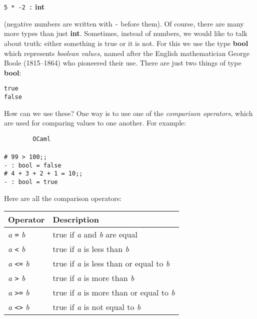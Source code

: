 \documentclass[]{book}
\newcommand{\smspace}{\vspace{4mm}}
\begin{document}
\smspace
\texttt{5 * -2 :}\textbf{\textsf{ int}}
\smspace

\noindent (negative numbers are written with \texttt{-} before them). Of course, there are many more types than just \textsf{\textbf{int}}. Sometimes, instead of numbers, we would like to talk about truth: either something is true or it is not. For this we use the type \textsf{\textbf{bool}} which represents \textit{boolean values}, named after the English mathematician George Boole (1815--1864) who pioneered their use. There are just two things of type \textbf{\textsf{bool}}:

\smspace
{}\texttt{true}\\
\indent{}\texttt{false}
\smspace

\noindent How can we use these? One way is to use one of the \textit{comparison operators}, which are used for comparing values to one another. For example:

\smspace
\noindent\verb!        OCaml!\\
\noindent\\
\noindent\verb!# 99 > 100;;!\\
\noindent\verb!- : bool = false!\\
\noindent\verb!# 4 + 3 + 2 + 1 = 10;;!\\
\noindent\verb!- : bool = true!
\smspace

\noindent Here are all the comparison operators:

\smspace
\noindent\begin{tabular}{@{}ll@{}} \toprule
Operator & Description\\
\midrule
\index{=@\texttt{=}}\textit{a} \texttt{=} \textit{b} & true if \textit{a} and \textit{b} are equal\\
\index{<@\texttt{<}}\textit{a} \texttt{<} \textit{b} & true if \textit{a} is less than \textit{b}\\
\index{<=@\texttt{<=}}\textit{a} \texttt{<=} \textit{b} & true if \textit{a} is less than or equal to \textit{b}\\
\index{>@\texttt{>}}\textit{a} \texttt{>} \textit{b} & true if \textit{a} is more than \textit{b}\\
\index{>=@\texttt{>=}}\textit{a} \texttt{>=} \textit{b} & true if \textit{a} is more than or equal to \textit{b}\\
\index{<>@\texttt{<>}}\textit{a} \texttt{<>} \textit{b} & true if \textit{a} is not equal to \textit{b}\\ \bottomrule
\end{tabular}
\smspace
\end{document}
